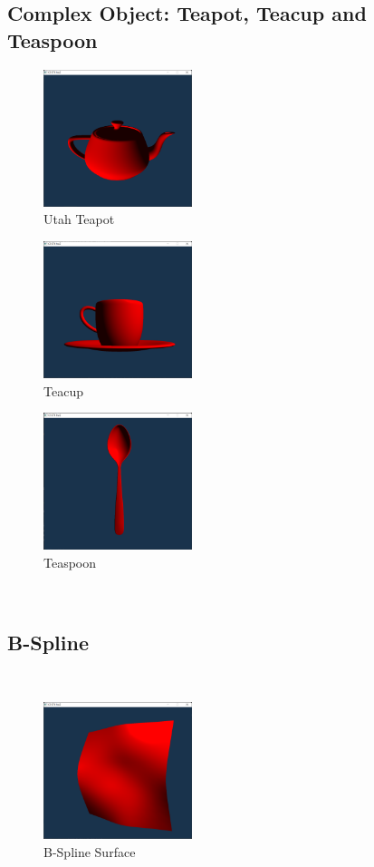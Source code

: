 \documentclass[acmtog]{acmart}
\begin{document}
\subsection{Complex Object: Teapot, Teacup and Teaspoon}
\begin{figure}[h]
    \centering
    \includegraphics[height = 4.0cm]{teapot_all.png}
    \caption{Utah Teapot}
\end{figure}
\begin{figure}[h]
    \centering
    \includegraphics[height = 4.0cm]{teacup.png}
    \caption{Teacup}
\end{figure}
\begin{figure}[h]
    \centering
    \includegraphics[height =4.0cm]{teaspoon.png}
    \caption{Teaspoon}
\end{figure}
\\
\subsection{B-Spline}
\\
\begin{figure}[H]
    \centering
    \includegraphics[height = 4.0cm]{bspline_surface.png}
    \caption{B-Spline Surface}
\end{figure}
\end{document}
